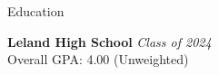 \documentclass[
	11pt, %
]{tex/resume} %
\begin{document}

\begin{rSection}{Education}
	
	\textbf{Leland High School} \hfill \textit{Class of 2024} \\ 
	Overall GPA: 4.00 (Unweighted)
	
\end{rSection}

\end{document}
